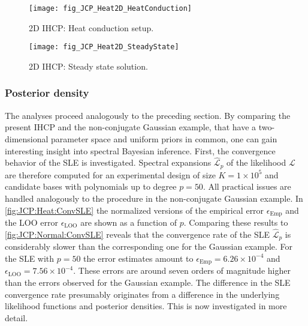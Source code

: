 \begin{figure}[htbp]
  \begin{minipage}[b]{\JCPsubWidth}
    \centering
    \texttt{[image: fig\_JCP\_Heat2D\_HeatConduction]}
    \caption[2D IHCP: Heat conduction setup]{2D IHCP: Heat conduction setup.}
    \label{fig:JCP:Heat:HeatConduction2D}
  \end{minipage}%
  \hfill%
  \begin{minipage}[b]{\JCPsubWidth}
    \centering
    \texttt{[image: fig\_JCP\_Heat2D\_SteadyState]}
    \caption[2D IHCP: Steady state solution]{2D IHCP: Steady state solution.}
    \label{fig:JCP:Heat:SteadyState2D}
  \end{minipage}%
\end{figure}

\subsubsection{Posterior density}
The analyses proceed analogously to the preceding section.
By comparing the present IHCP and the non-conjugate Gaussian example, that have a two-dimensional parameter space and uniform priors in common,
one can gain interesting insight into spectral Bayesian inference.
First, the convergence behavior of the SLE is investigated.
Spectral expansions \(\hat{\mathcal{L}}_p\) of the likelihood \(\mathcal{L}\) are therefore computed
for an experimental design of size \(K = 1 \times 10^5\) and candidate bases with polynomials up to degree \(p = 50\).
All practical issues are handled analogously to the procedure in the non-conjugate Gaussian example.
In \cref{fig:JCP:Heat:ConvSLE} the normalized versions of the empirical error \(\epsilon_{\mathrm{Emp}}\) and the LOO error \(\epsilon_{\mathrm{LOO}}\) are shown as a function of \(p\).
Comparing these results to \cref{fig:JCP:Normal:ConvSLE} reveals that the convergence rate of the SLE \(\hat{\mathcal{L}}_p\) is considerably slower than the corresponding one for the Gaussian example.
For the SLE with \(p = 50\) the error estimates amount to \(\epsilon_{\mathrm{Emp}} = 6.26 \times 10^{-4}\) and \(\epsilon_{\mathrm{LOO}} = 7.56 \times 10^{-4}\).
These errors are around seven orders of magnitude higher than the errors observed for the Gaussian example.
The difference in the SLE convergence rate presumably originates from a difference in the underlying likelihood functions and posterior densities.
This is now investigated in more detail.
